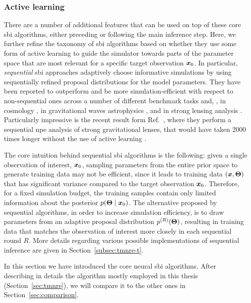 \subsubsection{Active learning} There are a number of additional features that can be used on top of these core \gls*{sbi} algorithms, either preceding or following the main inference step. Here, we further refine the taxonomy of \gls*{sbi} algorithms based on whether they use some form of {active learning} to guide the simulator towards parts of the parameter space that are most relevant for a specific target observation $\bm{x}_0$. In particular, \emph{sequential} \gls*{sbi} approaches adaptively choose informative simulations by using sequentially refined proposal distributions for the model parameters. They have been reported to outperform and be more simulation-efficient with respect to non-sequential ones across a number of different benchmark tasks \citep{Lueckmann:2021aa} and, \eg, in cosmology \cite{Cole:2021gwr}, in gravitational waves astrophysics \cite{Bhardwaj:2023xph}, and in strong lensing analysis \cite{wagnercarena2024strong}. Particularly impressive is the recent result form Ref.~\cite{wagnercarena2024strong}, where they perform a sequential \gls*{npe} analysis of strong gravitational lenses, that would have taken 2000 times longer without the use of active learning \cite[Figure 5 in][]{wagnercarena2024strong}.

The core intuition behind sequential \gls*{sbi} algorithms is the following: given a single observation of interest, $\bm{x}_0$, sampling parameters from the entire prior space to generate training data may not be efficient, since it leads to training data $(\bm{x}, \bm{\Theta})$ that has significant variance compared to the target observation $\bm{x}_0$. Therefore, for a fixed simulation budget, the training samples contain only limited information about the posterior $p(\bm{\Theta}\mid\bm{x}_0)$. The alternative proposed by sequential algorithms, in order to increase simulation efficiency, is to draw parameters from an adaptive proposal distribution $p^{(R)}(\bm{\Theta})$, resulting in training data that matches the observation of interest more closely in each sequential round $R$. More details regarding various possible implementations of sequential inference are given in Section~\ref{subsec:tmnre-t}.

\medskip

In this section we have introduced the core neural \gls*{sbi} algorithms. After describing in details the algorithm mostly employed in this thesis (Section~\ref{sec:tmnre}), we will compare it to the other ones in Section~\ref{sec:comparison}.



